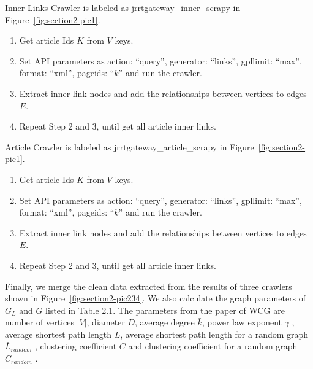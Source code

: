 \vspace{-10pt}
\noindent Inner Links Crawler is labeled as jrrtgateway\_inner\_scrapy in Figure~\ref{fig:section2-pic1}.
\vspace{-5pt}
\begin{enumerate}
	\item Get article Ids $K$ from $V$ keys.
	\item Set API parameters as {action: ``query'', generator: ``links'', gpllimit: ``max'', format: ``xml'', pageids: ``$k$''} and run the crawler. 
	\item Extract inner link nodes and add the relationships between vertices to edges $E$.
	\item Repeat Step 2 and 3, until get all article inner links.
\end{enumerate}

\noindent Article Crawler is labeled as jrrtgateway\_article\_scrapy in Figure~\ref{fig:section2-pic1}.
\vspace{-5pt}
\begin{enumerate}
	\item Get article Ids $K$ from $V$ keys.
	\item Set API parameters as {action: ``query'', generator: ``links'', gpllimit: ``max'', format: ``xml'', pageids: ``$k$''} and run the crawler. 
	\item Extract inner link nodes and add the relationships between vertices to edges $E$.
	\item Repeat Step 2 and 3, until get all article inner links.
\end{enumerate}

\indent Finally, we merge the clean data extracted from the results of three crawlers shown in Figure~\ref{fig:section2-pic234}. We also calculate the graph parameters of $G_L$ and $G$ listed in Table 2.1. The parameters from the paper of WCG \cite{zesch2007analysis} are number of vertices $|V|$, diameter $D$, average degree $\bar{k}$, power law exponent $\gamma$ \cite{doi:10.1080/00107510500052444} \cite{clauset2009power}, average shortest path length $\bar{L}$, average shortest path length for a random graph $\bar{L}_{random}$ \cite{watts1998collective}, clustering coefficient $C$ \cite{wasserman1994social} and clustering coefficient for a random graph $\bar{C}_{random}$ \cite{zlatic2006wikipedias}.



